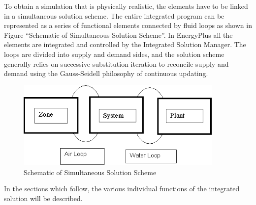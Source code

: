 To obtain a simulation that is physically realistic, the elements have to be linked in a simultaneous solution scheme. The entire integrated program can be represented as a series of functional elements connected by fluid loops as shown in Figure ``Schematic of Simultaneous Solution Scheme''. In EnergyPlus all the elements are integrated and controlled by the Integrated Solution Manager. The loops are divided into supply and demand sides, and the solution scheme generally relies on successive substitution iteration to reconcile supply and demand using the Gauss-Seidell philosophy of continuous updating.

\begin{figure}[hbtp] %
\centering
\includegraphics[width=0.9\textwidth, height=0.9\textheight, keepaspectratio=true]{media/image8.png}
\caption{Schematic of Simultaneous Solution Scheme \protect \label{fig:schematic-of-simultaneous-solution-scheme}}
\end{figure}

In the sections which follow, the various individual functions of the integrated solution will be described.
